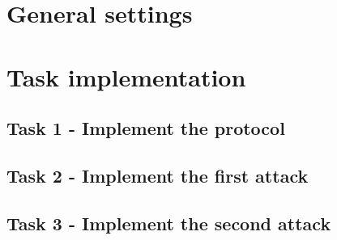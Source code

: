 \documentclass{report}
\begin{document}
\begingroup
\let\clearpage\relax
\chapter*{General settings}
\endgroup





\chapter*{Task implementation}
\section*{Task 1 - Implement the protocol}
 




\section*{Task 2 - Implement the first attack}





\section*{Task 3 - Implement the second attack}
\end{document}
